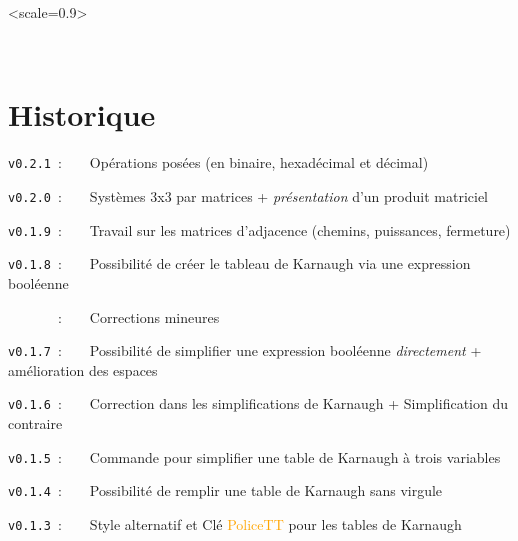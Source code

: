 \documentclass[french,a4paper,11pt]{article}
\providecommand\tikzlogo{Ti\textit{k}Z}
\providecommand\TeXLive{\TeX{}Live\xspace}
\let\TikZ\tikzlogo
\newcommand\TableauDocumentation{%
	\begin{tblr}{width=\linewidth,colspec={X[c]X[c]X[c]X[c]X[c]X[c]},cells={font=\large\sffamily}}
		{\LaTeX} & {\hologo{pdfLaTeX}} & {\hologo{LuaLaTeX}} & {\TikZ} & {\TeXLive} & {\hologo{MiKTeX}} \\
	\end{tblr}
}
\newcommand\Cle[1]{{\small\sffamily\textlangle \textcolor{orange}{#1}\textrangle}}
\begin{document}
{{\vspace{0.5cm}

\hfill
\begin{GrapheTikz}[Unite=0.75cm,CouleurSommets={gray/blue},Epaisseur={very thick/thick},CouleurFleches=orange]<scale=0.9>
\end{GrapheTikz}
\hfill~
\hfill~


%
%
%
%
%

\newpage

\hypertarget{matoc}{}

\tableofcontents

\vfill

\newpage

\section{Historique}

\verb|v0.2.1|~:~~~~Opérations posées (en binaire, hexadécimal et décimal)

\verb|v0.2.0|~:~~~~Systèmes 3x3 par matrices + \textit{présentation} d'un produit matriciel

\verb|v0.1.9|~:~~~~Travail sur les matrices d'adjacence (chemins, puissances, fermeture)

\verb|v0.1.8|~:~~~~Possibilité de créer le tableau de Karnaugh via une expression booléenne

\verb|      |~:~~~~Corrections mineures

\verb|v0.1.7|~:~~~~Possibilité de simplifier une expression booléenne \textit{directement} + amélioration des espaces

\verb|v0.1.6|~:~~~~Correction dans les simplifications de Karnaugh + Simplification du contraire

\verb|v0.1.5|~:~~~~Commande pour simplifier une table de Karnaugh à trois variables

\verb|v0.1.4|~:~~~~Possibilité de remplir une table de Karnaugh sans virgule

\verb|v0.1.3|~:~~~~Style alternatif et Clé \Cle{PoliceTT} pour les tables de Karnaugh

}}
\end{document}

